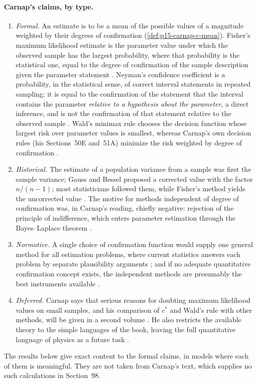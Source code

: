 \paragraph{Carnap's claims, by type.}
\begin{enumerate}
\item \emph{Formal.} An estimate is to be a mean of the possible values
of a magnitude weighted by their degrees of confirmation
\cite[ch.~IX, p.~511]{Carnap1950Probability}
(\cref{def:p15-carnap-c-mean}). Fisher's maximum likelihood estimate is
the parameter value under which the observed sample has the largest
probability, where that probability is the statistical one, equal to the
degree of confirmation of the sample description given the parameter
statement \cite[sec.~98, p.~515]{Carnap1950Probability}. Neyman's
confidence coefficient is a probability, in the statistical sense, of
correct interval statements in repeated sampling; it is equal to the
confirmation of the statement that the interval contains the parameter
\emph{relative to a hypothesis about the parameter}, a direct
inference, and is not the confirmation of that statement relative to
the observed sample \cite[sec.~98, p.~517]{Carnap1950Probability}.
Wald's minimax rule chooses the decision function whose largest risk
over parameter values is smallest, whereas Carnap's own decision rules
(his Sections~50E and~51A) minimize the risk weighted by degree of
confirmation \cite[sec.~98, pp.~517--518]{Carnap1950Probability}.
\item \emph{Historical.} The estimate of a population variance from a
sample was first the sample variance; Gauss and Bessel proposed a
corrected value with the factor \(n/(n-1)\); most statisticians
followed them, while Fisher's method yields the uncorrected value
\cite[sec.~98, p.~513]{Carnap1950Probability}. The motive for methods
independent of degree of confirmation was, in Carnap's reading, chiefly
negative: rejection of the principle of indifference, which enters
parameter estimation through the Bayes--Laplace theorem
\cite[sec.~98, p.~518]{Carnap1950Probability}.
\item \emph{Normative.} A single choice of confirmation function would
supply one general method for all estimation problems, where current
statistics answers each problem by separate plausibility arguments
\cite[sec.~98, p.~514]{Carnap1950Probability}; and if no adequate
quantitative confirmation concept exists, the independent methods are
presumably the best instruments available
\cite[sec.~98, p.~518]{Carnap1950Probability}.
\item \emph{Deferred.} Carnap says that serious reasons for doubting
maximum likelihood values on small samples, and his comparison of
\(c^*\) and Wald's rule with other methods, will be given in a second
volume \cite[sec.~98, pp.~515, 518--520]{Carnap1950Probability}. He
also restricts the available theory to the simple languages of the
book, leaving the full quantitative language of physics as a future
task \cite[sec.~98, p.~519]{Carnap1950Probability}.
\end{enumerate}
The results below give exact content to the formal claims, in models
where each of them is meaningful. They are not taken from Carnap's
text, which supplies no such calculations in Section~98.

